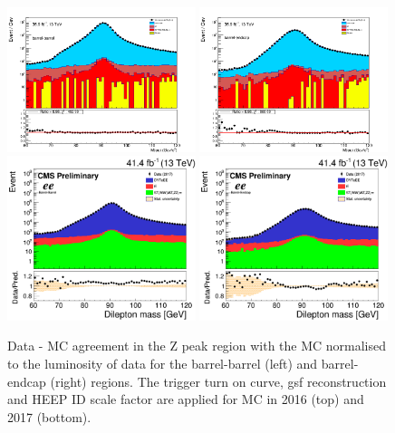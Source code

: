 \begin{figure}[bh]
\begin{center}
\includegraphics[angle=0,width=0.49\textwidth]{figures/Zprime/2016/zPeakDY/hratio_M_ee2__barrel-barrel.png}
\includegraphics[angle=0,width=0.49\textwidth]{figures/Zprime/2016/zPeakDY/hratio_M_ee2__barrel-endcap.png}
\includegraphics[angle=0,width=0.49\textwidth]{figures/Zprime/2017/zPeakDY/BB_hratio_M_ee.png}
\includegraphics[angle=0,width=0.49\textwidth]{figures/Zprime/2017/zPeakDY/BE_hratio_M_ee.png}
\end{center}
\caption{Data - MC agreement in the Z peak region with the MC normalised to the luminosity of data for the barrel-barrel (left) and barrel-endcap (right) regions. The trigger turn on curve, gsf reconstruction and HEEP ID scale factor are applied for MC in 2016 (top) and 2017 (bottom).}
\label{fig:Zpeak}
\end{figure}

